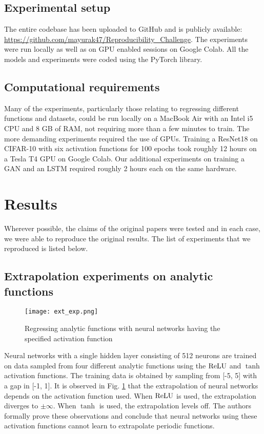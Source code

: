 \subsection{Experimental setup}

The entire codebase has been uploaded to GitHub and is publicly available: \url{https://github.com/mayurak47/Reproducibility_Challenge}. The experiments were run locally as well as on GPU enabled sessions on Google Colab. All the models and experiments were coded using the PyTorch library.

\subsection{Computational requirements}

Many of the experiments, particularly those relating to regressing different functions and datasets, could be run locally on a MacBook Air with an Intel i5 CPU and 8 GB of RAM, not requiring more than a few minutes to train. The more demanding experiments required the use of GPUs. Training a ResNet18 on CIFAR-10 with six activation functions for 100 epochs took roughly 12 hours on a Tesla T4 GPU on Google Colab. Our additional experiments on training a GAN and an LSTM required roughly 2 hours each on the same hardware.

\section{Results}

Wherever possible, the claims of the original papers were tested and in each case, we were able to reproduce the original results. The list of experiments that we reproduced is listed below.

\subsection{Extrapolation experiments on analytic functions}

\begin{figure}[h]

\centering
\texttt{[image: ext\_exp.png]}
\caption{Regressing analytic functions with neural networks having the specified activation function}
\label{fig:extrapolation}
\end{figure}

Neural networks with a single hidden layer consisting of 512 neurons are trained on data sampled from four different analytic functions using the $ \operatorname{ReLU} $ and $ \tanh $ activation functions. The training data is obtained by sampling from [-5, 5] with a gap in [-1, 1]. It is observed in Fig. \ref{fig:extrapolation} that the extrapolation of neural networks depends on the activation function used. When $ \operatorname{ReLU} $ is used, the extrapolation diverges to $\pm \infty$. When $ \tanh $ is used, the extrapolation levels off. The authors formally prove these observations and conclude that neural networks using these activation functions cannot learn to extrapolate periodic functions.

